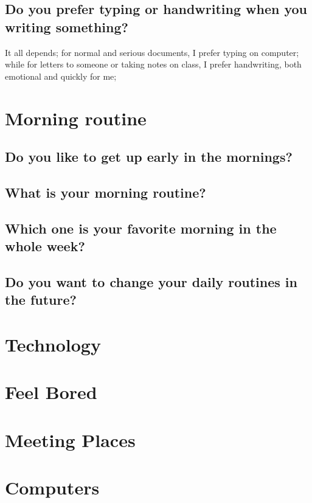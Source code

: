 \documentclass[conference]{IEEEtran}
\begin{document}
\subsection{Do you prefer typing or handwriting when you writing something?}
It all depends; for normal and serious documents, I prefer typing on computer;
while for letters to someone or taking notes on class, I prefer handwriting, both
emotional and quickly for me;

\section{Morning routine}
\subsection{Do you like to get up early in the mornings?}
\subsection{What is your morning routine?}
\subsection{Which one is your favorite morning in the whole week?}
\subsection{Do you want to change your daily routines in the future?}

\section{Technology}

\section{Feel Bored}

\section{Meeting Places}

\section{Computers}
\end{document}
